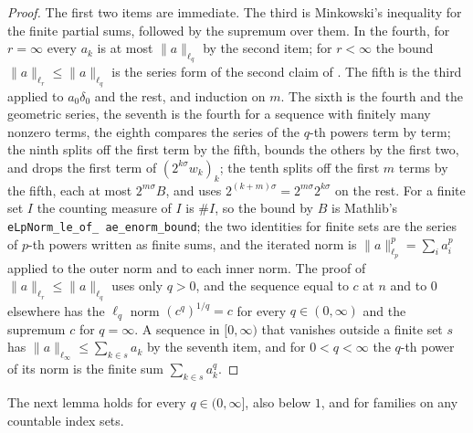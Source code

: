 \begin{proof}
\leanok
{}
The first two items are immediate. The third is Minkowski's inequality for the finite
partial sums, followed by the supremum over them. In the fourth, for $r = \infty$ every $a_k$ is
at most $\|a\|_{\ell_q}$ by the second item; for $r < \infty$ the bound
$\|a\|_{\ell_r} \leq \|a\|_{\ell_q}$ is the series form of the second claim of
. The fifth is the third applied to $a_0 \delta_0$ and the rest,
and induction on $m$. The sixth is the fourth and the geometric series, the seventh is the
fourth for a sequence with finitely many nonzero terms, the eighth compares the series of the
$q$-th powers term by term; the ninth splits off the first term by the fifth, bounds the others
by the first two, and drops the first term of $(2^{k\sigma} w_k)_k$; the tenth splits off the
first $m$ terms by the fifth, each at most $2^{m\sigma} B$, and uses
$2^{(k+m)\sigma} = 2^{m\sigma} 2^{k\sigma}$ on the rest. For a finite set $I$ the
counting measure of $I$ is $\# I$, so the
bound by $B$ is Mathlib's \texttt{eLpNorm\_\allowbreak le\_\allowbreak of\_\allowbreak
ae\_\allowbreak enorm\_\allowbreak bound}; the two identities for finite sets are the series of
$p$-th powers written as finite sums, and the iterated norm is
$\|a\|_{\ell_p}^p = \sum_i a_i^p$ applied to the outer norm and to each inner norm. The proof
of $\|a\|_{\ell_r} \leq \|a\|_{\ell_q}$ uses only $q > 0$, and the sequence equal to $c$ at $n$
and to $0$ elsewhere has the $\ell_q$ norm $(c^q)^{1/q} = c$ for every $q \in (0, \infty)$ and
the supremum $c$ for $q = \infty$. A sequence in $[0, \infty)$ that vanishes outside a finite set
$s$ has $\|a\|_{\ell_\infty} \leq \sum_{k \in s} a_k$ by the seventh item, and for
$0 < q < \infty$ the $q$-th power of its norm is the finite sum $\sum_{k \in s} a_k^q$.
\end{proof}

The next lemma holds for every $q \in (0, \infty]$, also below $1$, and for families on any
countable index sets.

